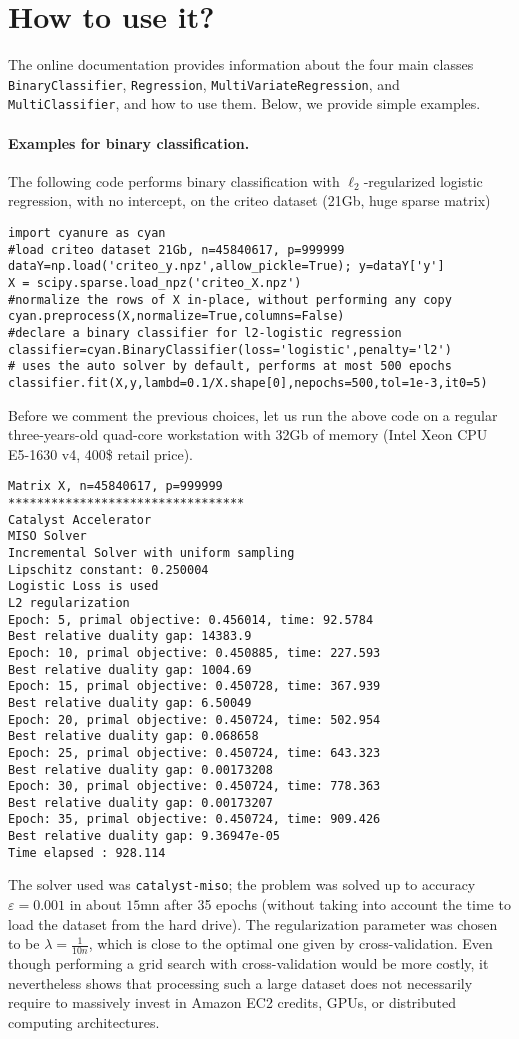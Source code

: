 \documentclass{article}
\begin{document}
\section{How to use it?}
The online documentation provides information about the four main classes
\texttt{BinaryClassifier}, \texttt{Regression},
\texttt{MultiVariateRegression}, and \texttt{MultiClassifier}, and how to use
them. Below, we provide simple examples.
\paragraph{Examples for binary classification.}
The following code performs binary classification with $\ell_2$-regularized logistic regression, with no intercept, on the criteo dataset (21Gb, huge sparse matrix)
\begin{verbatim}
import cyanure as cyan
#load criteo dataset 21Gb, n=45840617, p=999999
dataY=np.load('criteo_y.npz',allow_pickle=True); y=dataY['y']
X = scipy.sparse.load_npz('criteo_X.npz')
#normalize the rows of X in-place, without performing any copy
cyan.preprocess(X,normalize=True,columns=False) 
#declare a binary classifier for l2-logistic regression
classifier=cyan.BinaryClassifier(loss='logistic',penalty='l2')
# uses the auto solver by default, performs at most 500 epochs
classifier.fit(X,y,lambd=0.1/X.shape[0],nepochs=500,tol=1e-3,it0=5) 
\end{verbatim}

Before we comment the previous choices, let us 
run the above code on a regular three-years-old quad-core workstation with 32Gb of memory
(Intel Xeon CPU E5-1630 v4, 400\$ retail price). 
\begin{verbatim}
Matrix X, n=45840617, p=999999
*********************************
Catalyst Accelerator
MISO Solver
Incremental Solver with uniform sampling
Lipschitz constant: 0.250004
Logistic Loss is used
L2 regularization
Epoch: 5, primal objective: 0.456014, time: 92.5784
Best relative duality gap: 14383.9
Epoch: 10, primal objective: 0.450885, time: 227.593
Best relative duality gap: 1004.69
Epoch: 15, primal objective: 0.450728, time: 367.939
Best relative duality gap: 6.50049
Epoch: 20, primal objective: 0.450724, time: 502.954
Best relative duality gap: 0.068658
Epoch: 25, primal objective: 0.450724, time: 643.323
Best relative duality gap: 0.00173208
Epoch: 30, primal objective: 0.450724, time: 778.363
Best relative duality gap: 0.00173207
Epoch: 35, primal objective: 0.450724, time: 909.426
Best relative duality gap: 9.36947e-05
Time elapsed : 928.114
\end{verbatim}
The solver used was \texttt{catalyst-miso}; the problem was solved up to
accuracy $\varepsilon=0.001$ in about $15$mn after 35 epochs (without taking into account
the time to load the dataset from the hard drive). The regularization
parameter was chosen to be $\lambda=\frac{1}{10n}$, which is close to the
optimal one given by cross-validation.  Even though performing a grid search with
cross-validation would be more costly, it nevertheless shows that processing such 
a large dataset does not necessarily require to massively invest in Amazon EC2 credits,
GPUs, or distributed computing architectures.
\end{document}
